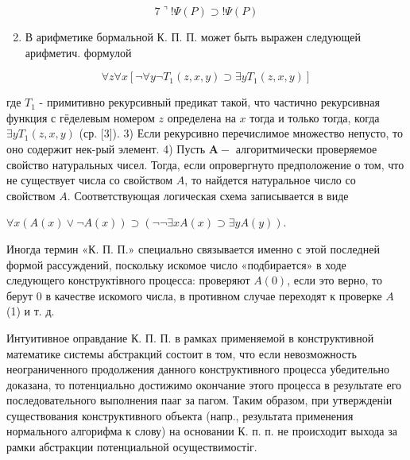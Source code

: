 \documentclass[10pt]{article}
\begin{document}
\[

7\urcorner ! \Psi(P) \supset ! \Psi(P)

\]



\begin{enumerate}

  \setcounter{enumi}{1}

  \item В арифметике бормальной К. П. П. может быть выражен следующей арифметич. формулой

\end{enumerate}



\[

\forall z \forall x\left[\neg \forall y \neg T_{1}(z, x, y) \supset \exists y T_{1}(z, x, y)\right]

\]



где $T_{1}$ - примитивно рекурсивный предикат такой, что частично рекурсивная функция с гёделевым номером $z$ определена на $x$ тогда и только тогда, когда $\exists y T_{1}(z, x, y)$ (ср. [3]). 3) Если рекурсивно перечислимое множество непусто, то оно содержит нек-рый элемент. 4) Пусть $\boldsymbol{A}-$ алгоритмически проверяемое свойство натуральных чисел. Тогда, если опровергнуто предположение о том, что не существует числа со свойством $A$, то найдется натуральное число со свойством $A$. Соответствующая логическая схема записывается в виде



$\forall x(A(x) \vee \neg A(x)) \supset(\neg \neg \exists x A(x) \supset \exists y A(y))$.



Иногда термин «К. П. П.» специально связывается именно с этой последней формой рассуждений, поскольку искомое число «подбирается» в ходе следующего конструктівного процесса: проверяют $A(0)$, если это верно, то берут 0 в качестве искомого числа, в противном случае переходят к проверке $A$ (1) и т. д.



Интуитивное оправдание К. П. П. в рамках применяемой в конструктивной математике системы абстракций состоит в том, что если невозможность неограниченного продолжения данного конструктивного процесса убедительно доказана, то потенциально достижимо окончание этого процесса в результате его последовательного выполнения пааг за пагом. Таким образом, при утвержденіи существования конструктивного объекта (напр., результата применения нормального алгорифма к слову) на основании К. п. п. не происходит выхода за рамки абстракции потенциальной осуществимостіг.
\end{document}
